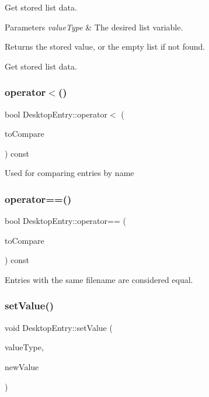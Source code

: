 Get stored list data.


\begin{DoxyParams}{Parameters}
{\em value\+Type} & The desired list variable.\\
\hline
\end{DoxyParams}
\begin{DoxyReturn}{Returns}
the stored value, or the empty list if not found.
\end{DoxyReturn}
Get stored list data. \mbox{\label{classDesktopEntry_a8d3abfb2d5c26d76ab9c5eb4fab21c15}} 
\subsubsection{\texorpdfstring{operator$<$()}{operator<()}}
{\footnotesize\ttfamily bool Desktop\+Entry\+::operator$<$ (\begin{DoxyParamCaption}\item[{const \mbox{\hyperlink{classDesktopEntry}{Desktop\+Entry}}}]{to\+Compare }\end{DoxyParamCaption}) const}

Used for comparing entries by name \mbox{\label{classDesktopEntry_a07661602b5612e069746f59369522bdc}} 
\subsubsection{\texorpdfstring{operator==()}{operator==()}}
{\footnotesize\ttfamily bool Desktop\+Entry\+::operator== (\begin{DoxyParamCaption}\item[{const \mbox{\hyperlink{classDesktopEntry}{Desktop\+Entry}}}]{to\+Compare }\end{DoxyParamCaption}) const}

Entries with the same filename are considered equal. \mbox{\label{classDesktopEntry_aa42670fee69fc7256997aafdcfda70d0}} 
\subsubsection{\texorpdfstring{set\+Value()}{setValue()}\hspace{0.1cm}{\footnotesize\ttfamily [1/3]}}
{\footnotesize\ttfamily void Desktop\+Entry\+::set\+Value (\begin{DoxyParamCaption}\item[{\mbox{\hyperlink{classDesktopEntry_a299e7c10728312fda6daf9ff926e3355}{String\+Value}}}]{value\+Type,  }\item[{String}]{new\+Value }\end{DoxyParamCaption})}

